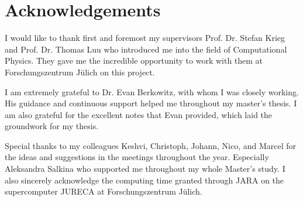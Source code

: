 \chapter*{Acknowledgements}
\label{sec:ack}

I would like to thank first and foremost my supervisors Prof. Dr. Stefan Krieg and Prof. Dr. Thomas Luu who introduced me into the field of Computational Physics. They gave me the incredible opportunity to work with them at Forschungszentrum Jülich on this project. 

I am extremely grateful to Dr. Evan Berkowitz, with whom I was closely working. His guidance and continuous support helped me throughout my master's thesis. I am also grateful for the excellent notes that Evan provided, which laid the groundwork for my thesis.

Special thanks to my colleagues Keshvi, Christoph, Johann, Nico, and Marcel for the ideas and suggestions in the meetings throughout the year. Especially Aleksandra Salkina who supported me throughout my whole Master's study. I also sincerely acknowledge the computing time granted through JARA on the supercomputer JURECA at Forschungszentrum Jülich.


